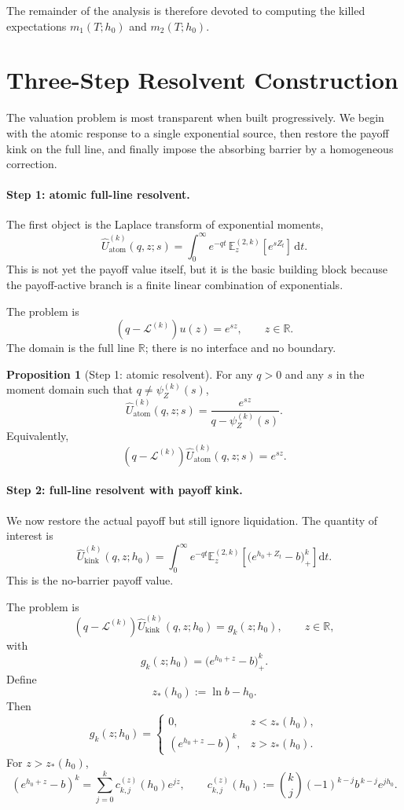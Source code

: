 \documentclass{article}
\newcommand{\E}{\mathbb{E}}
\newcommand{\R}{\mathbb{R}}
\newcommand{\diff}{\mathrm{d}}
\theoremstyle{definition}
\newtheorem{proposition}{Proposition}[section]
\begin{document}
The remainder of the analysis is therefore devoted to computing the killed expectations $m_1(T;h_0)$ and $m_2(T;h_0)$.

\section{Three-Step Resolvent Construction}

The valuation problem is most transparent when built progressively. We begin with the atomic response to a single
exponential source, then restore the payoff kink on the full line, and finally impose the absorbing barrier by a
homogeneous correction.

\paragraph{Step 1: atomic full-line resolvent.}
The first object is the Laplace transform of exponential moments,
\[
\widehat U_{\mathrm{atom}}^{(k)}(q,z;s)
=
\int_0^\infty e^{-qt}\,\E_z^{(2,k)}[e^{sZ_t}]\,\diff t.
\]
This is not yet the payoff value itself, but it is the basic building block because the payoff-active branch is a
finite linear combination of exponentials.

The problem is
\[
(q-\mathcal L^{(k)})u(z)=e^{sz},\qquad z\in\R.
\]
The domain is the full line $\R$; there is no interface and no boundary.

\begin{proposition}[Step 1: atomic resolvent]\label{prop:Uatom}
For any $q>0$ and any $s$ in the moment domain such that $q\neq \psi_Z^{(k)}(s)$,
\[
\boxed{
\widehat U_{\mathrm{atom}}^{(k)}(q,z;s)
=
\frac{e^{sz}}{q-\psi_Z^{(k)}(s)}.
}
\]
Equivalently,
\[
(q-\mathcal L^{(k)})\widehat U_{\mathrm{atom}}^{(k)}(q,z;s)=e^{sz}.
\]
\end{proposition}

\paragraph{Step 2: full-line resolvent with payoff kink.}
We now restore the actual payoff but still ignore liquidation. The quantity of interest is
\[
\widehat U_{\mathrm{kink}}^{(k)}(q,z;h_0)
=
\int_0^\infty e^{-qt}
\E_z^{(2,k)}\!\left[\big(e^{h_0+Z_t}-b\big)_+^k\right]\diff t.
\]
This is the no-barrier payoff value.

The problem is
\[
(q-\mathcal L^{(k)})\widehat U_{\mathrm{kink}}^{(k)}(q,z;h_0)
=
g_k(z;h_0),
\qquad z\in\R,
\]
with
\[
g_k(z;h_0)=\big(e^{h_0+z}-b\big)_+^k.
\]
Define
\[
z_*(h_0):=\ln b-h_0.
\]
Then
\[
g_k(z;h_0)=
\begin{cases}
0, & z<z_*(h_0),\\[4pt]
(e^{h_0+z}-b)^k, & z>z_*(h_0).
\end{cases}
\]
For $z>z_*(h_0)$,
\[
(e^{h_0+z}-b)^k
=
\sum_{j=0}^k c_{k,j}^{(z)}(h_0)e^{jz},
\qquad
c_{k,j}^{(z)}(h_0):=\binom{k}{j}(-1)^{k-j}b^{\,k-j}e^{jh_0}.
\]
\end{document}

